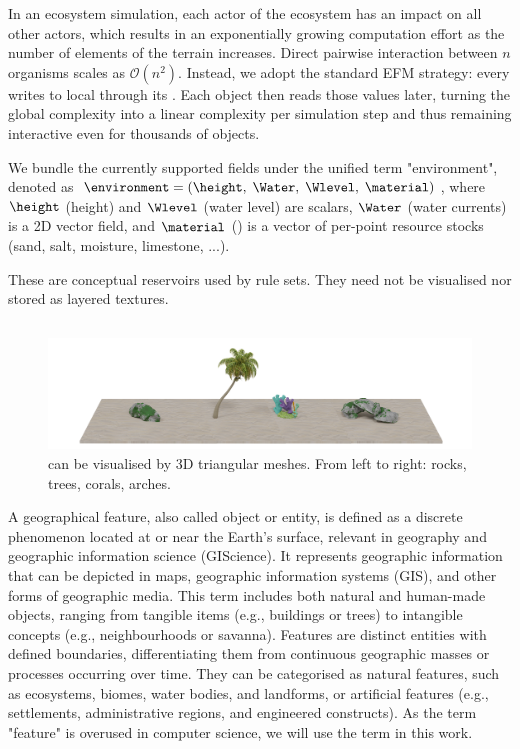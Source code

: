 In an ecosystem simulation, each actor of the ecosystem has an impact on all other actors, which results in an exponentially growing computation effort as the number of elements of the terrain increases. Direct pairwise interaction between $n$ organisms scales as $\mathcal{O}(n^{2})$.
Instead, we adopt the standard EFM strategy: every  writes to local  through its .
Each object then reads those values later, turning the global complexity into a linear complexity per simulation step and thus remaining interactive even for thousands of objects.

We bundle the currently supported fields under the unified term "environment", denoted as $\environment = (\height, \; \Water, \; \Wlevel, \; \material)$,
where $\height$ (height) and $\Wlevel$ (water level) are scalars, $\Water$ (water currents) is a 2D vector field, and $\material$ () is a vector of per-point resource stocks (sand, salt, moisture, limestone, ...).

These  are conceptual reservoirs used by rule sets. They need not be visualised nor stored as layered textures.

\subsection{}
\label{sec:env-obj-environmental-objects}

\begin{figure}
    \includegraphics{assets-demo.pdf}
    \caption{ can be visualised by 3D triangular meshes. From left to right: rocks, trees, corals, arches.}
    \label{fig:env-obj-assets}
\end{figure}

A geographical feature, also called object or entity, is defined as a discrete phenomenon located at or near the Earth's surface, relevant in geography and geographic information science (GIScience). It represents geographic information that can be depicted in maps, geographic information systems (GIS), and other forms of geographic media. This term includes both natural and human-made objects, ranging from tangible items (e.g., buildings or trees) to intangible concepts (e.g., neighbourhoods or savanna). Features are distinct entities with defined boundaries, differentiating them from continuous geographic masses or processes occurring over time. They can be categorised as natural features, such as ecosystems, biomes, water bodies, and landforms, or artificial features (e.g., settlements, administrative regions, and engineered constructs). As the term "feature" is overused in computer science, we will use the term  in this work.

